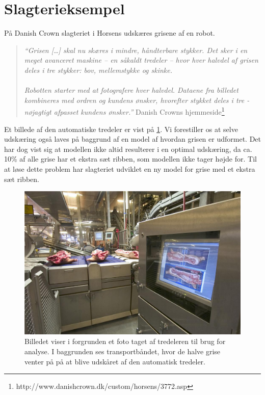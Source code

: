 \section{Slagterieksempel}

På Danish Crown slagteriet i Horsens udskæres grisene af en robot.

\begin{quote}\textit{``Grisen [\ldots] skal nu skæres i mindre, håndterbare stykker. Det sker i en meget avanceret maskine -- en såkaldt tredeler -- hvor hver halvdel af grisen deles i tre stykker: bov, mellemstykke og skinke. \\ 
\\
Robotten starter med at fotografere hver halvdel. Dataene fra billedet kombineres med ordren og kundens ønsker, hvorefter stykket deles i tre - nøjagtigt afpasset kundens ønsker.''}{ Danish Crowns hjemmeside\footnote{http://www.danishcrown.dk/custom/horsens/3772.asp}}\end{quote}

Et billede af den automatiske tredeler er vist  på \cref{fig:pig}. Vi forestiller os at selve udskæring også laves på baggrund af en model af hvordan grisen er udformet. Det har dog vist sig at modellen ikke altid resulterer i en  optimal udskæring, da  ca. 10\% af alle grise har et ekstra sæt ribben, som modellen ikke tager højde for. Til at løse dette problem har slagteriet udviklet en ny model for grise med et ekstra sæt ribben.

\begin{figure}
 \begin{center}
  \includegraphics[scale=0.5]{images/209690-1}
	\caption{Billedet viser i forgrunden  et foto taget af tredeleren til brug for analyse. I baggrunden ses transportbåndet, hvor de halve  grise venter på på at blive udskåret af den automatisk tredeler.}
	\label{fig:pig}
\end{center}
\end{figure}

